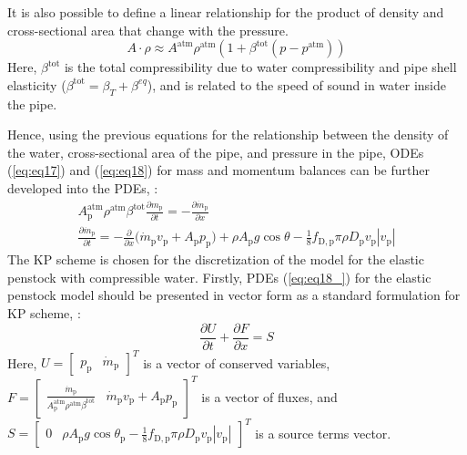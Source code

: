 \documentclass[%
]{USN-PhD}
\begin{document}
It is also possible to define a linear relationship for the product of density and cross-sectional area that change with the pressure.
\begin{equation}
A\cdot\rho \approx A^{\text{atm}}\rho^{\text{atm}}(1+{\beta^\mathrm{tot}(p-p^{\text{atm}})})
\end{equation}
Here, $\beta^\mathrm{tot}$ is the total compressibility due to water compressibility and pipe shell elasticity ($\beta^\mathrm{tot}=\beta_T+\beta^{eq}$), and is related to the speed of sound in water inside the pipe.

Hence, using the previous equations for the relationship between the density of the water, cross-sectional area of the pipe, and pressure in the pipe, ODEs (\ref{eq:eq17}) and (\ref{eq:eq18}) for mass and momentum balances can be further developed into the PDEs, \cite{Vyt:17}:
\begin{equation}\label{eq:eq18_}
\begin{array}{c}
A^{\text{atm}}_\mathrm{p}\rho^{\text{atm}}\beta^\mathrm{tot}\frac{\partial m_\mathrm{p}}{\partial t} = -\frac{\partial\dot{m}_\mathrm{p}}{\partial x}\\
\frac{\partial\dot{m}_\mathrm{p}}{\partial t} = -\frac{\partial}{\partial x}\big(\dot{m}_\mathrm{p}v_\mathrm{p}+A_\mathrm{p}p_\mathrm{p})+\rho A_\mathrm{p}g\cos\theta-\frac{1}{8}f_\mathrm{D,p}\pi\rho D_\mathrm{p}v_\mathrm{p}|v_\mathrm{p}|
\end{array}
\end{equation}
The KP scheme is chosen for the discretization of the model for the elastic penstock with compressible water. Firstly, PDEs (\ref{eq:eq18_}) for the elastic penstock model should be presented in vector form as a standard formulation for KP scheme, \cite{Sha:15}:
\begin{equation}
\frac{\partial U}{\partial t}+\frac{\partial F}{\partial x} = S
\end{equation}
Here, $U=\left[\begin{matrix}p_\mathrm{p} & \dot{m}_\mathrm{p}\end{matrix}\right]^T$ is a vector of conserved variables, $F=\left[\begin{matrix}\frac{\dot{m}_\mathrm{p}}{A_\mathrm{p}^{\mathrm{atm}}\rho^{\mathrm{atm}}
\beta^\mathrm{tot}} & \dot{m}_\mathrm{p}v_\mathrm{p}+A_\mathrm{p}p_\mathrm{p}\end{matrix}\right]^T$ is a vector of fluxes, and $S=\left[\begin{matrix} 0 & \rho A_\mathrm{p}g\cos\theta_\mathrm{p}-\frac{1}{8}f_\mathrm{D,p}\pi\rho D_\mathrm{p}v_\mathrm{p}|v_\mathrm{p}|\end{matrix}\right]^T$ is a source terms vector.
\end{document}
